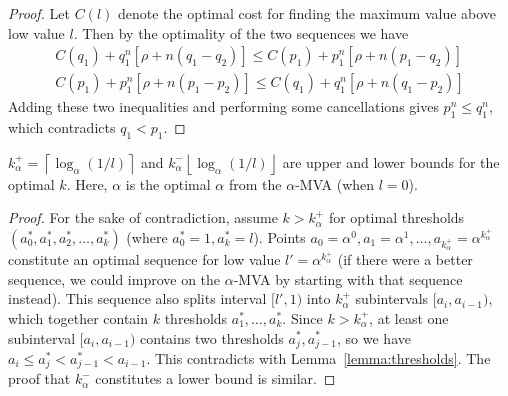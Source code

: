 \begin{proof}
Let $C(l)$ denote the optimal cost for finding the maximum value above low
value $l$.
Then by the optimality of the two sequences we have
\begin{align*}
  C(q_1) + q_1^n [\rho+n(q_1-q_2)] \leq C(p_1) + p_1^n [\rho + n(p_1-q_2)]\\
  C(p_1) + p_1^n [\rho+n(p_1-p_2)] \leq C(q_1) + q_1^n [\rho + n(q_1-p_2)]
\end{align*}
Adding these two inequalities and performing some cancellations gives
$p_1^n \leq q_1^n$, which contradicts $q_1 < p_1$.
\end{proof}


\begin{theorem}\label{theorem:k_bounds}
$k_\alpha^+ = \left\lceil \log_{\alpha} \left(1/l\right) \right\rceil$ and 
$k_\alpha^- \left\lfloor \log_{\alpha} \left(1/l\right) \right\rfloor$ are upper
and lower bounds for the optimal $k$. Here, $\alpha$ is the optimal $\alpha$
from the
$\alpha$-MVA (when $l = 0$). 
\end{theorem}
\begin{proof}
For the sake of contradiction, assume $k > k_\alpha^+$ for optimal thresholds
$(a^*_0, a^*_1, a^*_2, \ldots, a^*_k)$ (where $a^*_0 = 1, a^*_k = l$).  
Points $a_0 = \alpha^0, a_1 = \alpha^1, \ldots, a_{k_\alpha^+} = \alpha^{k_\alpha^+}$
constitute an optimal sequence for low value $l'=\alpha^{k_\alpha^+}$ (if there were a
better sequence, we could improve on the $\alpha$-MVA by starting
with that sequence instead).
This sequence also
splits interval $[l', 1)$ into $k_\alpha^+$ subintervals $[a_i, a_{i-1})$, which
together contain $k$ thresholds $a^*_1, \ldots, a^*_k$. Since $k > k_\alpha^+$, at
least one subinterval $[a_i, a_{i-1})$ contains two thresholds $a^*_j,
a^*_{j-1}$, so we have $a_i \leq a^*_j < a^*_{j-1} < a_{i-1}$.  This
contradicts with Lemma~\ref{lemma:thresholds}.
The proof that $k_\alpha^-$ constitutes a lower bound is similar.
\end{proof}


